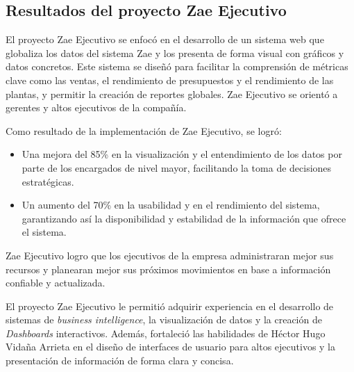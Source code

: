 \documentclass[protocolo.tex]{subfiles}
\begin{document}
\subsection{Resultados del proyecto Zae Ejecutivo}

El proyecto Zae Ejecutivo se enfocó en el desarrollo de un sistema web que globaliza los datos del sistema Zae y los presenta de forma visual con gráficos  y  datos  concretos.  Este sistema se diseñó para  facilitar  la  comprensión  de  métricas  clave  como  las  ventas,  el  rendimiento  de  presupuestos  y  el  rendimiento  de  las  plantas,  y  permitir  la  creación  de  reportes  globales.  Zae  Ejecutivo  se  orientó  a  gerentes  y  altos  ejecutivos  de  la  compañía.\vspace{4mm}

Como resultado de la implementación de Zae Ejecutivo, se logró:

\begin{itemize}
\item Una mejora del 85\%  en la visualización y el entendimiento de los datos por parte de los encargados de nivel mayor,  facilitando la toma de decisiones estratégicas.
\item Un aumento del 70\% en la usabilidad y en el rendimiento del sistema, garantizando así la disponibilidad y estabilidad de la información que ofrece el sistema.
\end{itemize}

Zae Ejecutivo logro que los ejecutivos de la empresa administraran mejor sus recursos y  planearan mejor  sus  próximos  movimientos  en  base a información confiable  y  actualizada.\vspace{4mm}

El proyecto Zae Ejecutivo le permitió adquirir experiencia en el desarrollo de sistemas de  \textit{business intelligence}, la visualización de datos y la creación de  \textit{Dashboards}  interactivos. Además, fortaleció las habilidades de Héctor Hugo Vidaña Arrieta en  el  diseño  de interfaces  de  usuario  para  altos  ejecutivos y la presentación de información de forma clara  y concisa.
\end{document}
